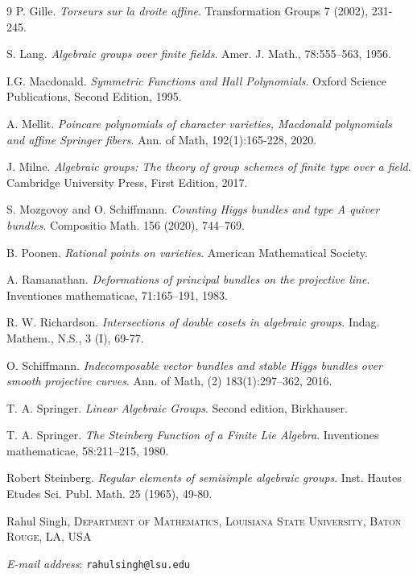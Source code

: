 \documentclass{amsart}
\makeatletter
\newcommand{\Address}{{%
  \bigskip
  \footnotesize

  Rahul Singh, \textsc{Department of Mathematics, Louisiana State University, Baton Rouge, LA, USA}\par\nopagebreak
  \textit{E-mail address}: \texttt{rahulsingh@lsu.edu}
}}
\theoremstyle{plain}
\theoremstyle{definition}
\theoremstyle{remark}
\makeatother
\begin{document}
\begin{thebibliography}{9}
P. Gille.
\textit{Torseurs sur la droite affine}.
Transformation Groups  7 (2002), 231-245.

S. Lang. 
\textit{Algebraic groups over finite fields}. Amer. J. Math., 78:555–563, 1956.

I.G. Macdonald.
\textit{Symmetric Functions and Hall Polynomials}. Oxford Science Publications, Second Edition, 1995.

A. Mellit. 
\textit{Poincare polynomials of character varieties, Macdonald polynomials and affine Springer fibers}.
Ann. of Math, 192(1):165-228, 2020.

J. Milne.
\textit{Algebraic groups: The theory of group schemes of finite type over a field}.
Cambridge University Press, First Edition, 2017.

S. Mozgovoy and O. Schiffmann.
\textit{Counting Higgs bundles and type A quiver bundles}.
Compositio Math. 156 (2020), 744–769.

B. Poonen.
\textit{Rational points on varieties}.
American Mathematical Society.

A. Ramanathan. 
\textit{Deformations of principal bundles on the projective line}.
Inventiones mathematicae, 71:165–191, 1983.

R. W. Richardson.
\textit{Intersections of double cosets in algebraic groups}.
Indag. Mathem., N.S., 3 (I), 69-77.

O. Schiffmann. 
\textit{Indecomposable vector bundles and stable Higgs bundles over smooth projective curves}.
Ann. of Math, (2)
183(1):297–362, 2016.

T. A. Springer.
\textit{Linear Algebraic Groups}.
Second edition, Birkhauser.

T. A. Springer.
\textit{The Steinberg Function of a Finite Lie Algebra}.
Inventiones mathematicae, 58:211–215, 1980.

Robert Steinberg.
\textit{Regular elements of semisimple algebraic groups}.
Inst. Hautes Etudes Sci. Publ. Math. 25 (1965), 49-80.
\end{thebibliography}
\Address
\end{document}
